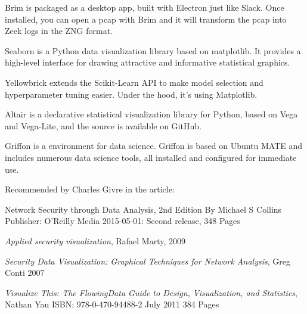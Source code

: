 \documentclass[Screen16to9,17pt]{foils}
\begin{document}
\begin{list2}
  \item {} Brim is packaged as a desktop app, built with Electron just like Slack. Once installed, you can open a pcap with Brim and it will transform the pcap into Zeek logs in the ZNG format.
  \item {} Seaborn is a Python data visualization library based on matplotlib. It provides a high-level interface for drawing attractive and informative statistical graphics.
  \item {}  Yellowbrick extends the Scikit-Learn API to make model selection and hyperparameter tuning easier. Under the hood, it’s using Matplotlib.
  \item {} Altair is a declarative statistical visualization library for Python, based on Vega and Vega-Lite, and the source is available on GitHub.
  \item {} Griffon is a environment for data science. Griffon is based on Ubuntu MATE and includes numerous data science tools, all installed and configured for immediate use.
\end{list2}

Recommended by Charles Givre in the article:\\




Network Security through Data Analysis, 2nd Edition
By Michael S Collins
Publisher: O'Reilly Media
2015-05-01: Second release, 348 Pages

\begin{list2}
\item \emph{Applied security visualization}, Rafael Marty, 2009
\item \emph{Security Data Visualization: Graphical Techniques for Network Analysis}, Greg Conti 2007
\item \emph{Visualize This: The FlowingData Guide to Design, Visualization, and Statistics}, Nathan Yau
ISBN: 978-0-470-94488-2 July 2011 384 Pages
\end{list2}


\end{document}
